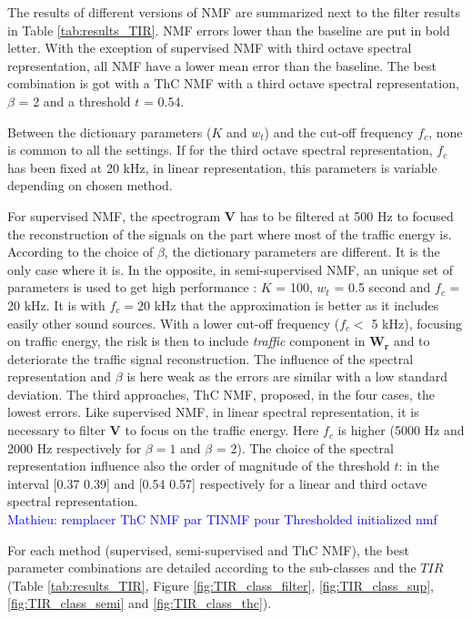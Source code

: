 \documentclass[twocolumn,a4paper,10pt]{article}
\newcommand{\ml}[1]{\textcolor{blue}{ Mathieu: #1}}
\begin{document}
The results of different versions of NMF are summarized next to the filter results in Table \ref{tab:results_TIR}. NMF errors lower than the baseline are put in bold letter. With the exception of supervised NMF with third octave spectral representation, all NMF have a lower mean error than the baseline. The best combination is got with a ThC NMF with a third octave spectral representation, $\beta$ = 2 and a threshold $t$ = 0.54.

Between the dictionary parameters ($K$ and $w_t$) and the cut-off frequency $f_c$, none is common to all the settings. If for the third octave spectral representation, $f_c$ has been fixed at 20 kHz, in linear representation, this parameters is variable depending on chosen method.

For supervised NMF, the spectrogram $\mathbf{V}$ has to be filtered at 500 Hz to focused the reconstruction of the signals on the part where most of the traffic energy is. According to the choice of $\beta$, the dictionary parameters are different. It is the only case where it is.
In the opposite, in semi-supervised NMF, an unique set of parameters is used to get high performance : $K$ = 100, $w_t$ = 0.5 second and $f_c$ = 20 kHz. It is with $f_c = 20$ kHz that the approximation is better as it includes easily other sound sources. With a lower cut-off frequency ($ f_c <$ 5 kHz), focusing on traffic energy, the risk is then to include \textit{traffic} component in $\mathbf{W_r}$ and to deteriorate the traffic signal reconstruction. The influence of the spectral representation and $\beta$ is here weak as the errors are similar with a low standard deviation. The third approaches, ThC NMF, proposed, in the four cases, the lowest errors. Like supervised NMF, in linear spectral representation, it is necessary to filter $\mathbf{V}$ to focus on the traffic energy. Here $f_c$ is higher (5000 Hz and 2000 Hz respectively for $\beta = 1$ and $\beta$ = 2). The choice of the spectral representation influence also the order of magnitude of the threshold $t$: in the interval [0.37 0.39] and [0.54 0.57] respectively for a linear and third octave spectral representation.\\

\ml{remplacer ThC NMF par TINMF pour Thresholded initialized nmf}

For each method (supervised, semi-supervised and ThC NMF), the best parameter combinations are detailed according to the sub-classes and the $TIR$ (Table \ref{tab:results_TIR},  Figure \ref{fig:TIR_class_filter}, \ref{fig:TIR_class_sup}, \ref{fig:TIR_class_semi} and \ref{fig:TIR_class_thc}). \\
\end{document}

